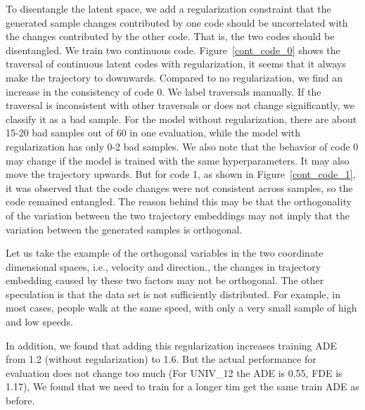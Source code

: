 To disentangle the latent space, we add a regularization constraint that the generated sample changes contributed by one code should be uncorrelated with the changes contributed by the other code. That is, the two codes should be disentangled. We train two continuous code. Figure~\ref{cont_code_0} shows the traversal of continuous latent codes with regularization, it seems that it always make the trajectory to downwards. Compared to no regularization, we find an increase in the consistency of code 0. We label traversals manually. If the traversal is inconsistent with other traversals or does not change significantly, we classify it as a bad sample. For the model without regularization, there are about 15-20 bad samples out of 60 in one evaluation, while the model with regularization has only 0-2 bad samples. We also note that the behavior of code 0 may change if the model is trained with the same hyperparameters. It may also move the trajectory upwards. But for code 1, as shown in Figure~\ref{cont_code_1}, it was observed that the code changes were not consistent across samples, so the code remained entangled. The reason behind this may be that the orthogonality of the variation between the two trajectory embeddings may not imply that the variation between the generated samples is orthogonal.

Let us take the example of the orthogonal variables in the two coordinate dimensional spaces, i.e., velocity and direction., the changes in trajectory embedding caused by these two factors may not be orthogonal. The other speculation is that the data set is not sufficiently distributed. For example, in most cases, people walk at the same speed, with only a very small sample of high and low speeds.

In addition, we found that adding this regularization increases training ADE from 1.2 (without regularization) to 1.6. But the actual performance for evaluation does not change too much (For UNIV\_12 the ADE is 0.55, FDE is 1.17), We found that we need to train for a longer tim get the same train ADE as before.

